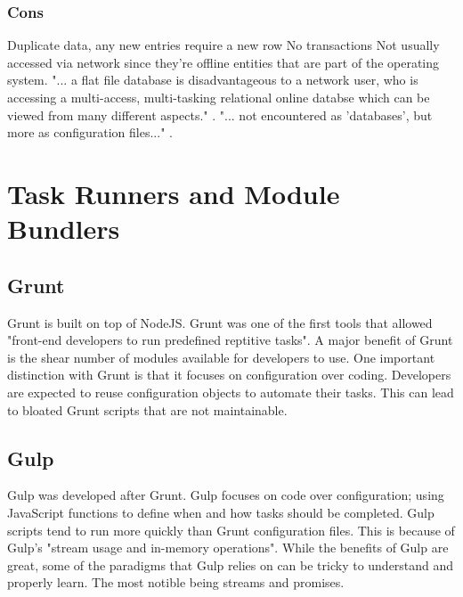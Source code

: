 \documentclass[draftclsnofoot,onecolumn,letterpaper,10pt,compsoc]{IEEEtran}
\begin{document}
        \subsubsection{Cons}
            Duplicate data, any new entries require a new row
            No transactions
            Not usually accessed via network since they're offline entities that are part of the operating system\cite{Techwalla}.
            "... a flat file database is disadvantageous to a network user, who is accessing a multi-access, multi-tasking relational online databse which can be viewed from many different aspects." \cite{Techwalla}.
            "... not encountered as 'databases', but more as configuration files..." \cite{Techwalla}.


\section{Task Runners and Module Bundlers}
	\subsection{Grunt}
        Grunt is built on top of NodeJS. 
        Grunt was one of the first tools that allowed "front-end developers to run predefined reptitive tasks"\cite{TaskRunners}. 
        A major benefit of Grunt is the shear number of modules available for developers to use. 
        One important distinction with Grunt is that it focuses on configuration over coding. 
        Developers are expected to reuse configuration objects to automate their tasks. 
        This can lead to bloated Grunt scripts that are not maintainable\cite{TaskRunners}.
    
	\subsection{Gulp}
        Gulp was developed after Grunt. Gulp focuses on code over configuration\cite{TaskRunners}; using JavaScript functions to define when and how tasks should be completed. 
        Gulp scripts tend to run more quickly than Grunt configuration files\cite{GulpGruntSpeed}. 
        This is because of Gulp's "stream usage and in-memory operations"\cite{TaskRunners}. 
        While the benefits of Gulp are great, some of the paradigms that Gulp relies on can be tricky to understand and properly learn. 
        The most notible being streams and promises\cite{TaskRunners}.
    
\end{document}
